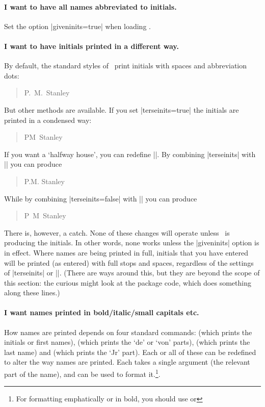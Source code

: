 \paragraph{I want to have all names abbreviated to initials.} Set the
option |giveninits=true| when loading \biblatex.

\paragraph{I want to have initials printed in a different way.} By
default, the standard styles of \biblatex\ print initials with spaces
and abbreviation dots:
\begin{quote}
  P.~M.~Stanley
\end{quote}
But other methods are available. If you set |terseinits=true| the initials are printed in a condensed way:
\begin{quote}
  PM~Stanley
\end{quote}
If you want a `halfway house', you can redefine |\bibinitperiod|. By combining |terseinits| with |\renewcommand{\bibinitperiod}{\adddot}| you can produce
\begin{quote}
  P.M. Stanley
\end{quote}
While by combining |terseinits=false| with |\renewcommand{\bibinitperiod}{}| you can produce
\begin{quote}
  P~M~Stanley
\end{quote}

There is, however, a catch. None of these changes will operate unless
\biblatex\ is producing the initials. In other words, none works
unless the |giveninits| option is in effect. Where names are being
printed in full, initials that you have entered will be printed (as
entered) with full stops and spaces, regardless of the settings of
|terseinits| or |\bibinitperiod|. (There are ways around this, but
they are beyond the scope of this section: the curious might look at
the  package code, which does something along these lines.)

\paragraph{I want names printed in bold/italic/small capitals etc.}
How names are printed depends on four standard commands:
 (which prints the initials or first names),
 (which prints the `de' or `von' parts),
 (which prints the last name) and
 (which prints the `Jr' part). Each or all of these
can be redefined to alter the way names are printed. Each takes a
single argument (the relevant part of the name), and can be used to
format it.\footnote{For formatting emphatically or in bold, you should
  use  or }.

